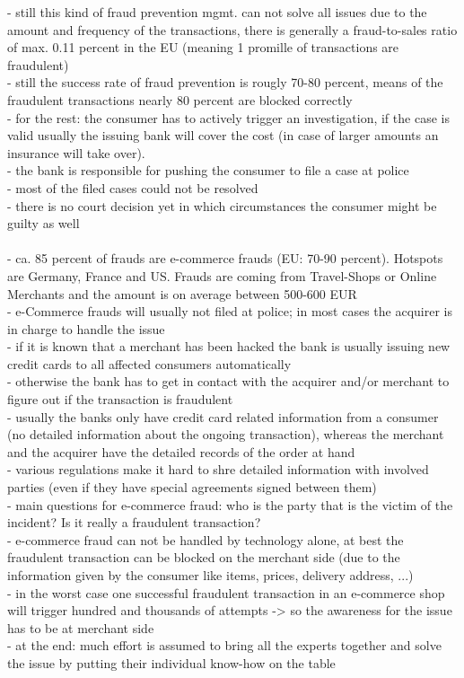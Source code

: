 - still this kind of fraud prevention mgmt. can not solve all issues due to the amount and frequency of the transactions, there is generally a
fraud-to-sales ratio of max. 0.11 percent in the EU (meaning 1 promille of transactions are fraudulent) \\
- still the success rate of fraud prevention is rougly 70-80 percent, means of the fraudulent transactions nearly 80 percent are blocked correctly \\
- for the rest: the consumer has to actively trigger an investigation, if the case is valid usually the issuing bank will cover the cost (in case of larger amounts an insurance will take over). \\
- the bank is responsible for pushing the consumer to file a case at police \\
- most of the filed cases could not be resolved \\
- there is no court decision yet in which circumstances the consumer might be guilty as well \\
\\
- ca. 85 percent of frauds are e-commerce frauds (EU: 70-90 percent). Hotspots are Germany, France and US. Frauds are coming from Travel-Shops or Online Merchants and the amount is on average between 500-600 EUR \\
- e-Commerce frauds will usually not filed at police; in most cases the acquirer is in charge to handle the issue \\
- if it is known that a merchant has been hacked the bank is usually issuing new credit cards to all affected consumers automatically \\
- otherwise the bank has to get in contact with the acquirer and/or merchant to figure out if the transaction is fraudulent \\
- usually the banks only have credit card related information from a consumer (no detailed information about the ongoing transaction), whereas the merchant and the acquirer have the detailed records of the order at hand \\
- various regulations make it hard to shre detailed information with involved parties (even if they have special agreements signed between them) \\
- main questions for e-commerce fraud: who is the party that is the victim of the incident? Is it really a fraudulent transaction? \\
- e-commerce fraud can not be handled by technology alone, at best the fraudulent transaction can be blocked on the merchant side (due to the information given by the consumer like items, prices, delivery address, ...) \\
- in the worst case one successful fraudulent transaction in an e-commerce shop will trigger hundred and thousands of attempts -> so the awareness for the issue has to be at merchant side \\
- at the end: much effort is assumed to bring all the experts together and solve the issue by putting their individual know-how on the table \\


